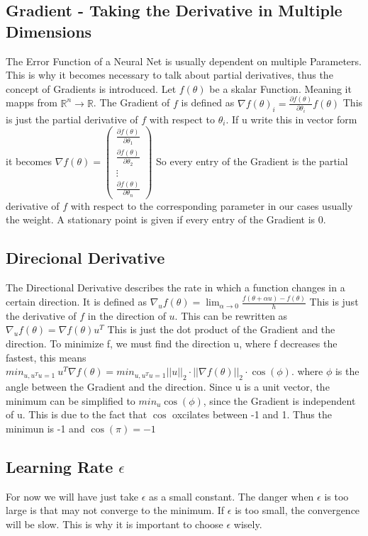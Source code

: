 \documentclass[a4paper]{article}
\begin{document}
\subsection{Gradient - Taking the Derivative in Multiple Dimensions}
The Error Function of a Neural Net is usually dependent on multiple Parameters. This is why it becomes necessary to talk about partial derivatives, thus the concept of Gradients is introduced. Let $f(\theta)$ be a skalar Function. Meaning it mapps from $\mathbb{R}^{n} \rightarrow \mathbb{R}$. The Gradient of $f$ is defined as $\nabla f(\theta)_{i} = \frac{\partial f(\theta)}{\partial \theta_{i}} f(\theta)$ This is just the partial derivative of $f$ with respect to $\theta_{i}$. If u write this in vector form it becomes $\nabla f(\theta) = \begin{pmatrix} \frac{\partial f(\theta)}{\partial \theta_{1}} \\ \frac{\partial f(\theta)}{\partial \theta_{2}} \\ \vdots \\ \frac{\partial f(\theta)}{\partial \theta_{n}} \end{pmatrix}$ So every entry of the Gradient is the partial derivative of $f$ with respect to the corresponding parameter in our cases usually the weight.
A stationary point is given if every entry of the Gradient is 0.

\subsection{Direcional Derivative}
The Directional Derivative describes the rate in which a function changes in a certain direction. It is defined as $\nabla_{u} f(\theta) = \lim_{\alpha \rightarrow 0} \frac{f(\theta + \alpha u) - f(\theta)}{h}$ This is just the derivative of $f$ in the direction of $u$. This can be rewritten as $\nabla_{u} f(\theta) = \nabla f(\theta) u^{T}$ This is just the dot product of the Gradient and the direction.
To minimize f, we must find the direction u, where f decreases the fastest, this means $min_{u,u^{T}u =1} \ u^{T} \nabla f(\theta) = min_{u,u^{T}u =1} ||u||_{2} \cdot ||\nabla f(\theta)||_{2} \cdot \cos(\phi) $.
where $\phi$ is the angle between the Gradient and the direction. Since u is a unit vector, the minimum can be simplified to $min_{u} \cos(\phi)$, since the Gradient is independent of u. This is due to the fact that $\cos$ oxcilates between -1 and 1. Thus the minimun is -1 and $\cos(\pi) = -1$ 

\subsection{Learning Rate $\epsilon$}
For now we will have  just take $\epsilon$ as a small constant. The danger when $\epsilon$ is too large is that may not converge to the minimum. If $\epsilon$ is too small, the convergence will be slow. This is why it is important to choose $\epsilon$ wisely.
\end{document}
